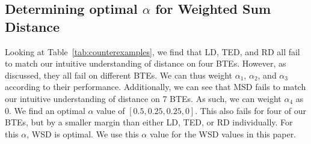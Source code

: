 \subsection{Determining optimal $\alpha$ for Weighted Sum Distance}
\label{ssec:results-alpha}

Looking at Table~\ref{tab:counterexamples}, we find that LD, TED, and RD all fail to match our intuitive understanding of distance on four BTEs. However, as discussed, they all fail on different BTEs. We can thus weight $\alpha_1$, $\alpha_2$, and $\alpha_3$ according to their performance. Additionally, we can see that MSD fails to match our intuitive understanding of distance on 7 BTEs. As such, we can weight $\alpha_4$ as 0. We find an optimal $\alpha$ value of $[0.5, 0.25, 0.25, 0]$. This also fails for four of our BTEs, but by a smaller margin than either LD, TED, or RD individually. For this $\alpha$, WSD is optimal. We use this $\alpha$ value for the WSD values in this paper.





















